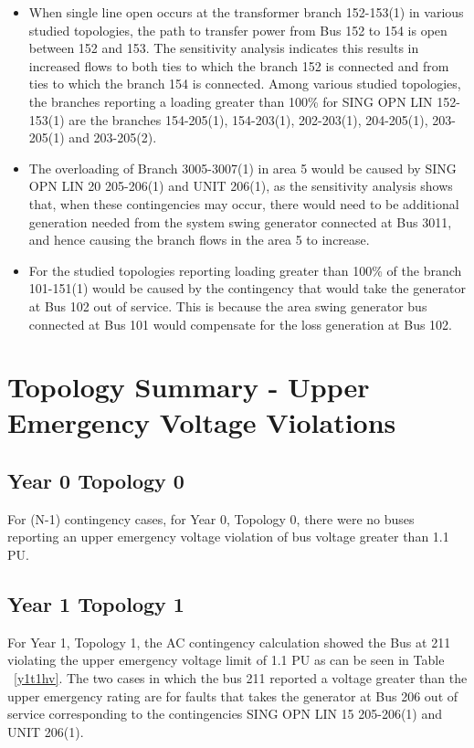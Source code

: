 \documentclass[10pt]{report}
\begin{document}
\begin{itemize}
\item When single line open occurs at the transformer branch 152-153(1) in various studied topologies, the path to transfer power from Bus 152 to 154 is open between 152 and 153. The sensitivity analysis indicates this results in increased flows to both ties to which the branch 152 is connected and from ties to which the branch 154 is connected. Among various studied topologies, the branches reporting a loading greater than 100\% for SING OPN LIN 152-153(1) are the branches 154-205(1), 154-203(1), 202-203(1), 204-205(1), 203-205(1) and 203-205(2). 
\item The overloading of Branch 3005-3007(1) in area 5 would be caused by SING OPN LIN 20 205-206(1) and UNIT 206(1), as the sensitivity analysis shows that, when these contingencies may occur, there would need to be additional generation needed from the system swing generator connected at Bus 3011, and hence causing the branch flows in the area 5 to increase.
\item For the studied topologies reporting loading greater than 100\% of the branch 101-151(1) would be caused by the contingency that would take the generator at Bus 102 out of service. This is because the area swing generator bus connected at Bus 101 would compensate for the loss generation at Bus 102.
\end{itemize}


\chapter{Topology Summary - Upper Emergency Voltage Violations}
\label{chap:upemvol}

\section{Year 0 Topology 0}

For (N-1) contingency cases, for Year 0, Topology 0, there were no buses reporting an upper emergency voltage violation of bus voltage greater than 1.1 PU. 

\section{Year 1 Topology 1}
For Year 1, Topology 1, the AC contingency calculation showed the Bus at 211 violating the upper emergency voltage limit of 1.1 PU as can be seen in Table ~\ref{y1t1hv}. The two cases in which the bus 211 reported a voltage greater than the upper emergency rating are for faults that takes the generator at Bus 206 out of service corresponding to the contingencies SING OPN LIN   15 205-206(1) and UNIT 206(1). 
\end{document}
